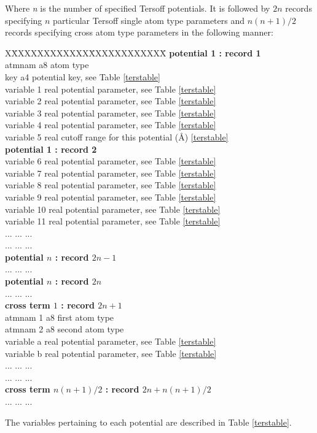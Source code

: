 Where {\em n} is the number of specified Tersoff potentials. 
It is followed by $2n$ records specifying $n$ particular Tersoff
single atom type parameters and $n(n+1)/2$ records specifying
cross atom type parameters in the following manner:
\begin{tabbing}
X\=XXXXXXXXXXXX\=XXXXXXXXXXXX\=\kill
{\bf potential 1 : record 1} \\
\> atmnam       \> a8   \> atom type \\
\> key          \> a4   \> potential key, see Table \ref{terstable} \\
\> variable 1   \> real \> potential parameter, see Table \ref{terstable} \\
\> variable 2   \> real \> potential parameter, see Table \ref{terstable} \\
\> variable 3   \> real \> potential parameter, see Table \ref{terstable} \\
\> variable 4   \> real \> potential parameter, see Table \ref{terstable} \\
\> variable 5   \> real \> cutoff range for this potential (\AA) \ref{terstable} \\
{\bf potential 1 : record 2} \\
\> variable 6   \> real \> potential parameter, see Table \ref{terstable} \\
\> variable 7   \> real \> potential parameter, see Table \ref{terstable} \\
\> variable 8   \> real \> potential parameter, see Table \ref{terstable} \\
\> variable 9   \> real \> potential parameter, see Table \ref{terstable} \\
\> variable 10  \> real \> potential parameter, see Table \ref{terstable} \\
\> variable 11  \> real \> potential parameter, see Table \ref{terstable} \\
\> ... \> ... \> ... \\
\> ... \> ... \> ... \\
{\bf potential $n$ : record $2n-1$} \\
\> ... \> ... \> ... \\
{\bf potential $n$ : record $2n$} \\
\> ... \> ... \> ... \\
{\bf cross term $1$ : record $2n+1$} \\
\> atmnam 1     \> a8   \> first atom type \\
\> atmnam 2     \> a8   \> second atom type \\
\> variable a   \> real \> potential parameter, see Table \ref{terstable} \\
\> variable b   \> real \> potential parameter, see Table \ref{terstable} \\
\> ... \> ... \> ... \\
\> ... \> ... \> ... \\
{\bf cross term $n(n+1)/2$ : record $2n+n(n+1)/2$} \\
\> ... \> ... \> ... \\
\end{tabbing}
The variables pertaining to each potential are described in Table
\ref{terstable}.

